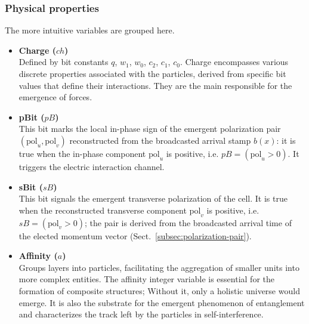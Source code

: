 \documentclass{ijuc}
\begin{document}
\subsubsection{Physical properties}
The more intuitive variables are grouped here.
\begin{itemize}
	\item \textbf{Charge ($ch$)} \\
Defined by bit constants $q$, $w_{1}$, $w_{0}$, $c_{2}$, $c_{1}$, $c_{0}$.
Charge encompasses various discrete properties associated with the particles, derived from specific bit values that define their interactions. They are the main responsible for the emergence of forces.

	\item \textbf{pBit ($pB$)} \\
This bit marks the local in-phase sign of the emergent polarization pair $(\mathrm{pol}_u,\mathrm{pol}_v)$ reconstructed from the broadcasted arrival stamp $b(x)$: it is true when the in-phase component $\mathrm{pol}_u$ is positive, i.e. $pB = (\mathrm{pol}_u>0)$. It triggers the electric interaction channel.

	\item \textbf{sBit ($sB$)} \\
This bit signals the emergent transverse polarization of the cell. It is true when the reconstructed transverse component $\mathrm{pol}_v$ is positive, i.e. $sB = (\mathrm{pol}_v>0)$; the pair is derived from the broadcasted arrival time of the elected momentum vector (Sect.~\ref{subsec:polarization-pair}).

	\item \textbf{Affinity ($a$)} \\
Groups layers into particles, facilitating the aggregation of smaller units into more complex entities. The affinity integer variable is essential for the formation of composite structures; Without it, only a holistic universe would emerge. It is also the substrate for the emergent phenomenon of entanglement and characterizes the track left by the particles in self-interference.
\end{itemize}
\end{document}
